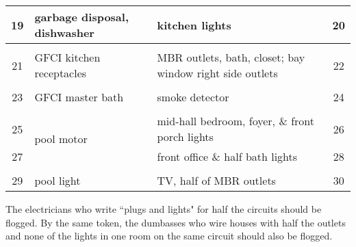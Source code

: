 \documentclass[10pt]{article}
\newcommand{\sep}{1mm}
\newcommand{\negsep}{-4mm}
\newcommand{\+}{\item}		%
\begin{document}
{\begin{minipage}[c]{3.36in}
\begin{tabular}{| c | p{1.19in} | p{1.19in} | c | }
19 & garbage disposal, dishwasher & kitchen lights & 20 \\[\sep]
\hline\\[\negsep]

21 & GFCI kitchen receptacles & MBR outlets, bath, closet; bay window right side outlets & 22 \\[\sep]
\hline\\[\negsep]

23 & GFCI master bath & smoke detector & 24 \\[\sep]
\hline\\[\negsep]

25 & \multirow{2}{1.15in}{\centering pool motor} & mid-hall bedroom, foyer, \& front porch lights & 26 \\[\sep]
\cline{3-4}
27 &  & front office \& half bath lights & 28 \\[\sep]
\hline\\[\negsep]

29 & \centering pool light & TV, half of MBR outlets & 30 \\[\sep]
\hline

\end{tabular}
\smallskip

\begin{footnotesize}
The electricians who write ``plugs and lights" for half the circuits should be flogged.
By the same token, the dumbasses who wire houses with half the outlets and none of the lights in one room on the same circuit should also be flogged.
\end{footnotesize}

\end{minipage}
}
\end{document}
